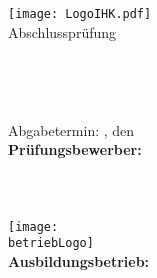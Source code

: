 \begin{titlepage}

\begin{center}
\texttt{[image: LogoIHK.pdf]}\\[1ex]
\Large{Abschlussprüfung \pruefungstermin}\\[3ex]

\Large{\ausbildungsberuf}\\
\LARGE{\betreff}\\[4ex]

\huge{\textbf{\titel}}\\[1.5ex]
\Large{\textbf{\untertitel}}\\[8ex]

\normalsize
Abgabetermin: \abgabeOrt, den \abgabeTermin\\[3em]
\textbf{Prüfungsbewerber:}\\
\autorName\\
\autorAnschrift\\
\autorOrt\\[5ex]

\texttt{[image: \\betriebLogo]}\\[2ex]
\textbf{Ausbildungsbetrieb:}\\
\betriebName\\
\betriebAnschrift\\
\betriebOrt\\[5em]
\end{center}

\end{titlepage}